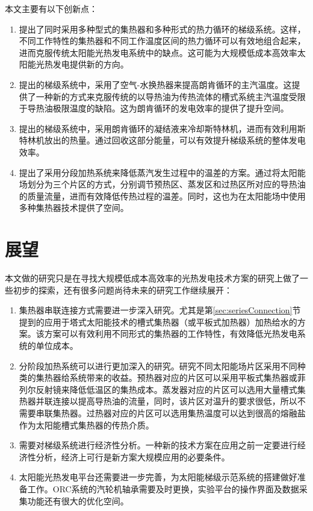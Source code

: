 本文主要有以下创新点：
\begin{enumerate}[label=(\arabic*)]
  \item 提出了同时采用多种型式的集热器和多种形式的热力循环的梯级系统。这样，不同工作特性的集热器和不同工作温度区间的热力循环可以有效地组合起来，进而克服传统太阳能光热发电系统中的缺点。这可能为大规模低成本高效率太阳能光热发电提供新的方向。
  \item 提出的梯级系统中，采用了空气-水换热器来提高朗肯循环的主汽温度。这提供了一种新的方式来克服传统的以导热油为传热流体的槽式系统主汽温度受限于导热油极限温度的缺陷。这为朗肯循环的发电效率的提供了提升空间。
  \item 提出的梯级系统中，采用朗肯循环的凝结液来冷却斯特林机，进而有效利用斯特林机放出的热量。通过回收这部分能量，可以有效提升梯级系统的整体发电效率。
  \item 提出了采用分段加热系统来降低蒸汽发生过程中的温差的方案。通过将太阳能场划分为三个片区的方式，分别调节预热区、蒸发区和过热区所对应的导热油的质量流量，进而有效降低传热过程的温差。同时，这也为在太阳能场中使用多种集热器技术提供了空间。
\end{enumerate}

\section{展望}
本文做的研究只是在寻找大规模低成本高效率的光热发电技术方案的研究上做了一些初步的探索，还有很多问题尚待未来的研究工作继续展开：
\begin{enumerate}[label=(\arabic*)]
  \item 集热器串联连接方式需要进一步深入研究。尤其是第\ref{sec:seriesConnection}节提到的应用于塔式太阳能技术的槽式集热器（或平板式加热器）加热给水的方案。该方案可以有效利用不同形式的集热器的工作特性，有效降低光热发电系统的单位成本。
  \item 分阶段加热系统可以进行更加深入的研究。研究不同太阳能场片区采用不同种类的集热器给系统带来的收益。预热器对应的片区可以采用平板式集热器或菲列尔反射镜来降低低温区的集热成本。蒸发器对应的片区可以选用大量槽式集热器并联连接以提高导热油的流量，同时，该片区对温升的要求很低，所以不需要串联集热器。过热器对应的片区可以选用集热温度可以达到很高的熔融盐作为太阳能槽式集热器的传热介质。
  \item 需要对梯级系统进行经济性分析。一种新的技术方案在应用之前一定要进行经济性分析，经济上可行是新方案大规模应用的必要条件。
  \item 太阳能光热发电平台还需要进一步完善，为太阳能梯级示范系统的搭建做好准备工作。ORC系统的汽轮机轴承需要及时更换，实验平台的操作界面及数据采集功能还有很大的优化空间。
\end{enumerate}